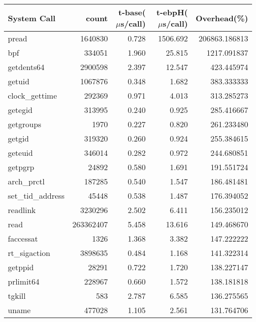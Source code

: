 \begin{tabular}{lrrrr}
\toprule
       System Call &      count &  t-base($\mu$s/call) &  t-ebpH($\mu$s/call) &   Overhead(\%) \\
\midrule
             pread &    1640830 &                0.728 &             1506.692 &  206863.186813 \\
               bpf &     334051 &                1.960 &               25.815 &    1217.091837 \\
        getdents64 &    2900598 &                2.397 &               12.547 &     423.445974 \\
            getuid &    1067876 &                0.348 &                1.682 &     383.333333 \\
    clock\_gettime &     292369 &                0.971 &                4.013 &     313.285273 \\
           getegid &     313995 &                0.240 &                0.925 &     285.416667 \\
         getgroups &       1970 &                0.227 &                0.820 &     261.233480 \\
            getgid &     319320 &                0.260 &                0.924 &     255.384615 \\
           geteuid &     346014 &                0.282 &                0.972 &     244.680851 \\
           getpgrp &      24892 &                0.580 &                1.691 &     191.551724 \\
       arch\_prctl &     187285 &                0.540 &                1.547 &     186.481481 \\
 set\_tid\_address &      45448 &                0.538 &                1.487 &     176.394052 \\
          readlink &    3230296 &                2.502 &                6.411 &     156.235012 \\
              read &  263362407 &                5.458 &               13.616 &     149.468670 \\
         faccessat &       1326 &                1.368 &                3.382 &     147.222222 \\
     rt\_sigaction &    3898635 &                0.484 &                1.168 &     141.322314 \\
           getppid &      28291 &                0.722 &                1.720 &     138.227147 \\
         prlimit64 &     228967 &                0.660 &                1.572 &     138.181818 \\
            tgkill &        583 &                2.787 &                6.585 &     136.275565 \\
             uname &     477028 &                1.105 &                2.561 &     131.764706 \\
\bottomrule
\end{tabular}

